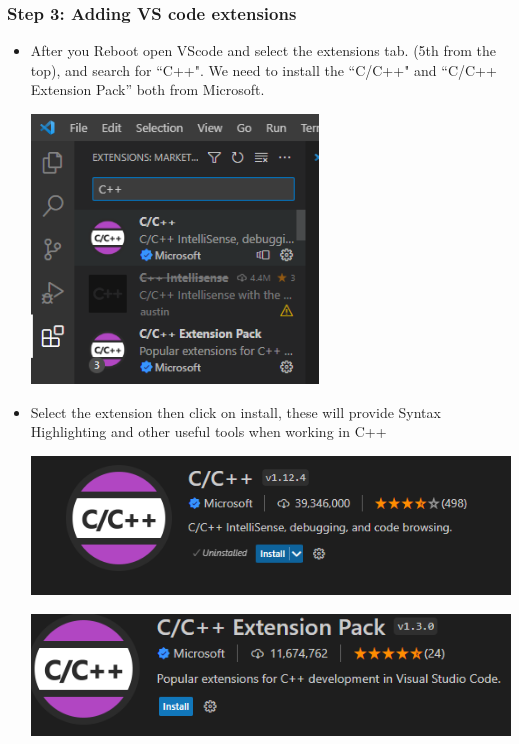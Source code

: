 \subsubsection{Step 3: Adding VS code extensions}

\begin{itemize}
    \item After you Reboot open VScode and select the extensions tab. (5th from the top), and search for ``C++". We need to install the ``C/C++" and “C/C++ Extension Pack” both from Microsoft.

    \includegraphics[width=3in]{images/windowsVSCodeSetup/image12.png}

    \item Select the extension then click on install, these will provide Syntax Highlighting and other useful tools when working in C++

    \includegraphics[width=5in]{images/windowsVSCodeSetup/image11.png}

    \includegraphics[width=5in]{images/windowsVSCodeSetup/image14.png}
\end{itemize}

